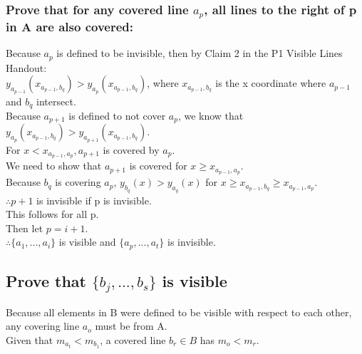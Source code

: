 \documentclass{article}
\begin{document}
    \subsubsection*{Prove that for any covered line $a_{p}$, all lines to the right of p in A are also covered:}
        Because $a_p$ is defined to be invisible, then by Claim 2 in the P1 Visible Lines Handout:\\
        $y_{a_{p-1}}(x_{a_{p-1}, b_{q}}) > y_{a_{p}}(x_{a_{p-1},b_{q}})$, where $x_{a_{p-1}, b_{q}}$ is the x coordinate where $a_{p-1}$ and $b_q$ intersect.\\
        Because $a_{p+1}$ is defined to not cover $a_p$, we know that $y_{a_{p}}(x_{a_{p-1}, b_{q}}) > y_{a_{p+1}}(x_{a_{p-1},b_{q}})$.\\
        For $x < x_{a_{p-1},a_{p}}, a_{p+1}$ is covered by $a_p$.\\
        We need to show that $a_{p+1}$ is covered for $x \geq x_{a_{p-1},a_{p}}$.\\
        Because $b_q$ is covering $a_p$, $y_{b_{q}}(x) > y_{a_{q}}(x)$ for $x \geq x_{a_{p-1},b_{q}} \geq x_{a_{p-1},a_{p}}$.\\
        $\therefore p+1$ is invisible if p is invisible.\\
        This follows for all p.\\
        Then let $p = i + 1$.\\
        $\therefore \{a_1,...,a_i\}$ is visible and $\{a_p,...,a_t\}$ is invisible.\\

\subsection*{Prove that $\{b_{j},...,b_{s}\}$ is visible}
    Because all elements in B were defined to be visible with respect to each other, any covering line $a_{o}$ must be from A.\\
    Given that $m_{a_{t}} < m_{b_{1}}$, a covered line $b_{r} \in B$ has $m_{o} < m_{r}$.
    
\end{document}

